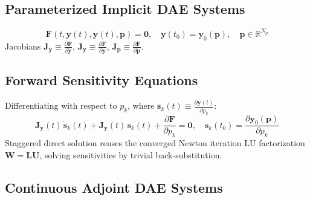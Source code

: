 \documentclass[11pt,a4paper]{article}
\begin{document}
\subsection{Parameterized Implicit DAE Systems}
\label{subsec:parameterized-daes}

\begin{equation}
\mathbf{F}(t, \mathbf{y}(t), \dot{\mathbf{y}}(t), \mathbf{p}) = \mathbf{0}, \quad \mathbf{y}(t_0) = \mathbf{y}_0(\mathbf{p}), \quad \mathbf{p} \in \mathbb{R}^{N_p}
\end{equation}
Jacobians $\mathbf{J}_{\dot{\mathbf{y}}} \equiv \frac{\partial \mathbf{F}}{\partial \dot{\mathbf{y}}}$, $\mathbf{J}_{\mathbf{y}} \equiv \frac{\partial \mathbf{F}}{\partial \mathbf{y}}$, $\mathbf{J}_{\mathbf{p}} \equiv \frac{\partial \mathbf{F}}{\partial \mathbf{p}}$.

\subsection{Forward Sensitivity Equations}
\label{subsec:forward-sensitivity}

Differentiating with respect to $p_k$, where $\mathbf{s}_k(t) \equiv \frac{\partial \mathbf{y}(t)}{\partial p_k}$:
\begin{equation}
\mathbf{J}_{\dot{\mathbf{y}}}(t) \, \dot{\mathbf{s}}_k(t) + \mathbf{J}_{\mathbf{y}}(t) \, \mathbf{s}_k(t) + \frac{\partial \mathbf{F}}{\partial p_k} = \mathbf{0}, \quad \mathbf{s}_k(t_0) = \frac{\partial \mathbf{y}_0(\mathbf{p})}{\partial p_k}
\end{equation}
Staggered direct solution reuses the converged Newton iteration LU factorization $\mathbf{W} = \mathbf{L}\mathbf{U}$, solving sensitivities by trivial back-substitution.

\subsection{Continuous Adjoint DAE Systems}
\label{subsec:continuous-adjoint}
\end{document}
